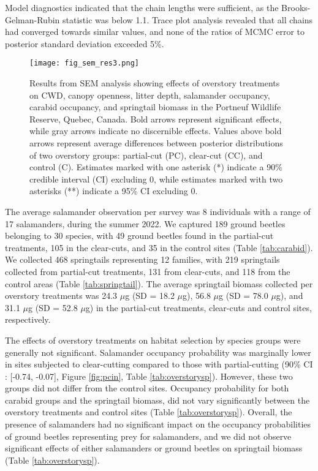 Model diagnostics indicated that the chain lengths were sufficient, as the Brooks-Gelman-Rubin statistic was below 1.1. 
Trace plot analysis revealed that all chains had converged towards similar values, and none of the ratios of MCMC error to posterior standard deviation exceeded 5\%.

\vspace{10pt}

\begin{figure}[ht]
	\centering
	\texttt{[image: fig\_sem\_res3.png]}
	\caption[Results from structural equation modeling analysis revealing effects of overstory treatments on coarse woody debris volume,
  canopy openness, litter depth, salamander occupancy, carabid occupancy, and springtail biomass.]
  {Results from SEM analysis showing effects of overstory treatments on CWD, 
  canopy openness, litter depth, salamander occupancy, carabid occupancy, and springtail biomass in the Portneuf Wildlife Reserve, 
  Quebec, Canada. Bold arrows represent significant effects, while gray arrows indicate no discernible effects. 
  Values above bold arrows represent average differences between posterior distributions of two overstory groups: 
  partial-cut (PC), clear-cut (CC), and control (C). Estimates marked with one asterisk (*) 
  indicate a 90\% credible interval (CI) excluding 0, while estimates marked with two asterisks (**) indicate a 95\% CI excluding 0.}
	\label{fig:SEMres}
\end{figure}  

\vspace{10pt}

The average salamander observation per survey was 8 individuals with a range of 17 salamanders, during the summer 2022.
We captured 189 ground beetles belonging to 30 species, with 49 ground beetles found in the partial-cut treatments, 105 in the clear-cuts, and 35 in the control sites (Table \ref{tab:carabid}). 
We collected 468 springtails representing 12 families, with 219 springtails collected from partial-cut treatments, 131 from clear-cuts, and 118 from the control areas (Table \ref{tab:springtail}). 
The average springtail biomass collected per overstory treatments was 24.3 $\mu$g (SD = 18.2 $\mu$g), 56.8 $\mu$g (SD = 78.0 $\mu$g), and 31.1 $\mu$g (SD = 52.8 $\mu$g) in the partial-cut treatments, clear-cuts and control sites, respectively.

The effects of overstory treatments on habitat selection by species groups were generally not significant. 
Salamander occupancy probability was marginally lower in sites subjected to clear-cutting compared to those with partial-cutting (90\% CI : [-0.74, -0.07], Figure \ref{fig:pcin}, Table \ref{tab:overstorysp}). 
However, these two groups did not differ from the control sites. 
Occupancy probability for both carabid groups and the springtail biomass, did not vary significantly between the overstory treatments and control sites (Table \ref{tab:overstorysp}). 
Overall, the presence of salamanders had no significant impact on the occupancy probabilities of ground beetles representing prey for salamanders, and we did not observe significant effects of either salamanders or ground beetles on springtail biomass (Table \ref{tab:overstorysp}).

